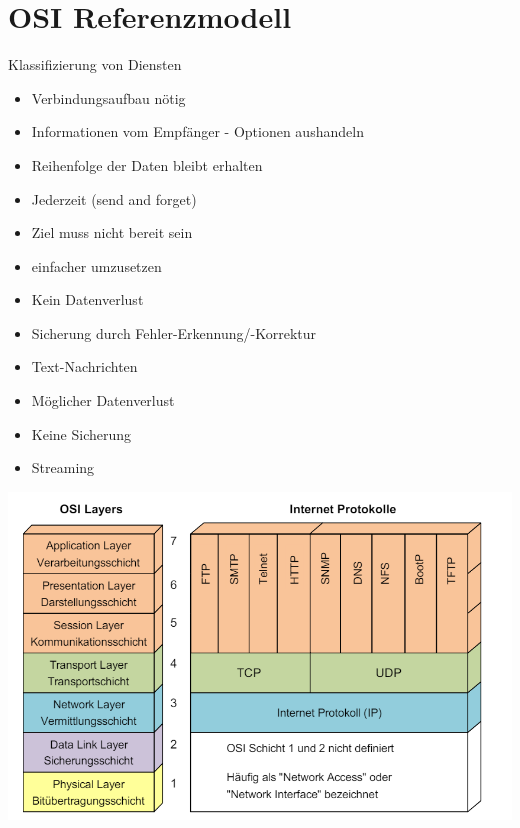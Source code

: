 \section{OSI Referenzmodell}
    \begin{highlight}{Klassifizierung von Diensten}
    \begin{center}
        \begin{minipage}{0.46\linewidth}
                    \begin{itemize}
                        \item Verbindungsaufbau nötig
                        \item Informationen vom Empfänger - Optionen aushandeln
                        \item Reihenfolge der Daten bleibt erhalten
                    \end{itemize}
                \begin{itemize}
                    \item Jederzeit (send and forget)
                    \item Ziel muss nicht bereit sein
                    \item einfacher umzusetzen
                \end{itemize}
        \end{minipage}
        \hfill\vline\hfill
        \begin{minipage}{0.47\linewidth}
                \begin{itemize}
                    \item Kein Datenverlust
                    \item Sicherung durch Fehler-Erkennung/-Korrektur
                    \item Text-Nachrichten
                \end{itemize}
            \begin{itemize}
                \item Möglicher Datenverlust
                \item Keine Sicherung
                \item Streaming
            \end{itemize}
        \end{minipage}
    \end{center}
\end{highlight}

\includegraphics[width=1\linewidth]{images/OSI_Modell.png}




 
    
 